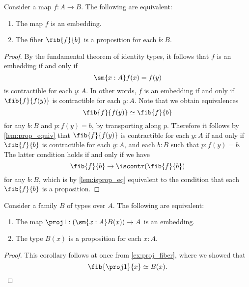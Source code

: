 \begin{thm}\label{thm:embedding}
  Consider a map $f:A\to B$. The following are equivalent:
  \begin{enumerate}
  \item The map $f$ is an embedding.
  \item The fiber $\fib{f}{b}$ is a proposition for each $b:B$.
  \end{enumerate}
\end{thm}

\begin{proof}
  By the fundamental theorem of identity types, it follows that $f$ is an embedding if and only if
  \begin{equation*}
    \sm{x:A}f(x)=f(y)
  \end{equation*}
  is contractible for each $y:A$. In other words, $f$ is an embedding if and only if $\fib{f}{f(y)}$ is contractible for each $y:A$. Note that we obtain equivalences
  \begin{equation*}
    \fib{f}{f(y)}\simeq \fib{f}{b}
  \end{equation*}
  for any $b:B$ and $p:f(y)=b$, by transporting along $p$. Therefore it follows by \cref{lem:prop_equiv} that $\fib{f}{f(y)}$ is contractible for each $y:A$ if and only if $\fib{f}{b}$ is contractible for each $y:A$, and each $b:B$ such that $p:f(y)=b$. The latter condition holds if and only if we have
  \begin{equation*}
    \fib{f}{b}\to\iscontr(\fib{f}{b})
  \end{equation*}
  for any $b:B$, which is by \cref{lem:isprop_eq} equivalent to the condition that each $\fib{f}{b}$ is a proposition.
\end{proof}

\begin{cor}\label{cor:pr1-embedding}
  Consider a family $B$ of types over $A$. The following are equivalent:
  \begin{enumerate}
  \item The map $\proj 1 : (\sm{x:A}B(x))\to A$ is an embedding.
  \item The type $B(x)$ is a proposition for each $x:A$.
  \end{enumerate}
\end{cor}

\begin{proof}
  This corollary follows at once from \cref{ex:proj_fiber}, where we showed that
  \begin{equation*}
    \fib{\proj 1}{x}\simeq B(x).\qedhere
  \end{equation*}
\end{proof}

